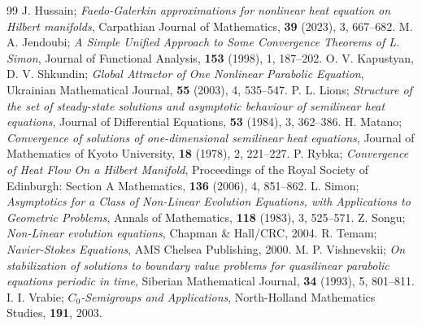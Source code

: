 \documentclass[10pt,a4paper]{amsart}
\numberwithin{equation}{section}
\begin{document}
\begin{thebibliography}{99}
 J. Hussain; \emph{Faedo-Galerkin approximations for nonlinear heat equation on Hilbert manifolds}, Carpathian Journal of Mathematics, \textbf{39}  (2023), 3, 667--682.
 M. A. Jendoubi; \emph{A Simple Unified Approach to Some Convergence Theorems of L. Simon}, Journal of Functional Analysis, \textbf{153} (1998), 1, 187--202.
 O. V. Kapustyan, D. V. Shkundin; \emph{Global Attractor of One Nonlinear Parabolic Equation}, Ukrainian Mathematical Journal, \textbf{55} (2003), 4, 535--547.
 P. L. Lions; \emph{Structure of the set of steady-state solutions and asymptotic behaviour of semilinear heat equations}, Journal of Differential Equations, \textbf{53}  (1984), 3, 362--386.
 H. Matano; \emph{Convergence of solutions of one-dimensional semilinear heat equations}, Journal of Mathematics of Kyoto University, \textbf{18} (1978), 2, 221--227.
 P. Rybka; \emph{Convergence of Heat Flow On a Hilbert Manifold}, Proceedings of the Royal Society of Edinburgh: Section A Mathematics, \textbf{136}  (2006), 4, 851--862.
 L. Simon; \emph{Asymptotics for a Class of Non-Linear Evolution Equations, with Applications to Geometric Problems}, Annals of Mathematics, \textbf{118} (1983), 3, 525--571.
 Z. Songu; \emph{Non-Linear evolution equations}, Chapman \& Hall/CRC, 2004.
 R. Temam; \emph{Navier-Stokes Equations}, AMS Chelsea Publishing, 2000.
 M. P. Vishnevskii; \emph{On stabilization of solutions to boundary value problems for quasilinear parabolic equations periodic in time}, Siberian Mathematical Journal, \textbf{34}  (1993), 5, 801--811.
 I. I. Vrabie; \emph{ $C_{0}$-Semigroups and Applications}, North-Holland Mathematics Studies, \textbf{191}, 2003.
\end{thebibliography}
\end{document}
